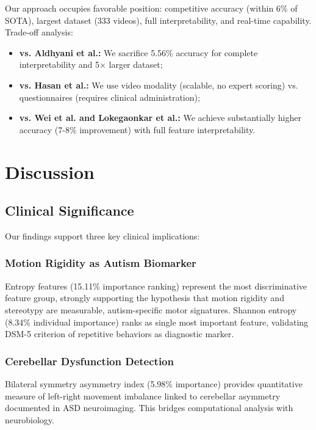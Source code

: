 \documentclass[conference]{IEEEtran}
\begin{document}
Our approach occupies favorable position: competitive accuracy (within 6\% of SOTA), largest dataset (333 videos), full interpretability, and real-time capability. Trade-off analysis:

\begin{itemize}
\item \textbf{vs. Aldhyani et al.:} We sacrifice 5.56\% accuracy for complete interpretability and 5× larger dataset;
\item \textbf{vs. Hasan et al.:} We use video modality (scalable, no expert scoring) vs. questionnaires (requires clinical administration);
\item \textbf{vs. Wei et al. and Lokegaonkar et al.:} We achieve substantially higher accuracy (7-8\% improvement) with full feature interpretability.
\end{itemize}

\section{Discussion}

\subsection{Clinical Significance}

Our findings support three key clinical implications:

\subsubsection{Motion Rigidity as Autism Biomarker}

Entropy features (15.11\% importance ranking) represent the most discriminative feature group, strongly supporting the hypothesis that motion rigidity and stereotypy are measurable, autism-specific motor signatures. Shannon entropy (8.34\% individual importance) ranks as single most important feature, validating DSM-5 criterion of repetitive behaviors as diagnostic marker.

\subsubsection{Cerebellar Dysfunction Detection}

Bilateral symmetry asymmetry index (5.98\% importance) provides quantitative measure of left-right movement imbalance linked to cerebellar asymmetry documented in ASD neuroimaging. This bridges computational analysis with neurobiology.
\end{document}
